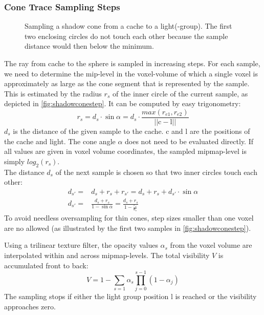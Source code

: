 \documentclass[thesis.tex]{subfiles}
\begin{document}
\subsubsection{Cone Trace Sampling Steps}
\begin{figure}[h]
	\centering
	\caption{Sampling a shadow cone from a cache to a light(-group). The first two enclosing circles do not touch each other because the sample distance would then below the minimum.} \label{fig:shadowconestep}
\end{figure}
The ray from cache to the sphere is sampled in increasing steps.
For each sample, we need to determine the mip-level in the voxel-volume of which a single voxel is approximately as large as the cone segment that is represented by the sample.
This is estimated by the radius $r_s$ of the inner circle of the current sample, as depicted in \autoref{fig:shadowconestep}.
It can be computed by easy trigonometry:
\begin{equation}
r_s = d_s \cdot \sin \alpha = d_s \cdot \frac{max(r_{e1}, r_{e2})}{||\mathrm{c} - \mathrm{l}||}
\end{equation}
$d_s$ is the distance of the given sample to the cache. $\mathrm{c}$ and $\mathrm{l}$ are the positions of the cache and light.
The cone angle $\alpha$ does not need to be evaluated directly. %
If all values are given in voxel volume coordinates, the sampled mipmap-level is simply $log_2(r_s)$.\\
The distance $d_s$ of the next sample is chosen so that two inner circles touch each other:
\begin{align}
d_{s'} =& d_s + r_s + r_{s'} = d_s + r_s + d_{s'} \cdot \sin \alpha\\
d_{s'} =& \frac{d_s + r_s}{1-\sin\alpha} = \frac{d_s + r_s}{1-\frac{r_s}{d_s}} 
\end{align}
To avoid needless oversampling for thin cones, step sizes smaller than one voxel are no allowed (as illustrated by the first two samples in \autoref{fig:shadowconestep}).

Using a trilinear texture filter, the opacity values $\alpha_s$ from the voxel volume are interpolated within and across mipmap-levels.
The total visibility $V$ is accumulated front to back:
\begin{equation}
V = 1 - \sum\limits_{s=1}\alpha_s \prod\limits_{j=0}^{s-1}(1-\alpha_j)
\end{equation}
The sampling stops if either the light group position $\mathrm{l}$ is reached or the visibility approaches zero.
\end{document}
